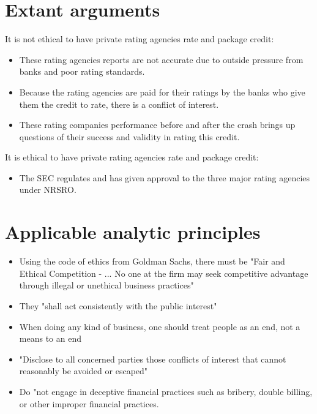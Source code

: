 \documentclass[11pt]{article}
\begin{document}
\section{Extant arguments}
It is not ethical to have private rating agencies rate and package credit:
\begin{itemize}
\item These rating agencies reports are not accurate due to outside pressure from banks and poor rating standards.\cite{ratingEthics} \cite{hRatingEthics} \cite{govtReport}
\item Because the rating agencies are paid for their ratings by the banks who give them the credit to rate, there is a conflict of interest. \cite{gatekeepers}
\item These rating companies performance before and after the crash brings up questions of their success and validity in rating this credit. \cite{ratingEthics} \cite{wpMoodies}
\end{itemize}
It is ethical to have private rating agencies rate and package credit:
\begin{itemize}
\item The SEC regulates and has given approval to the three major rating agencies under NRSRO. \cite{CivilLiability}
\end{itemize}

\section{Applicable analytic principles}
\begin{itemize}
\item Using the code of ethics from Goldman Sachs, there must be "Fair and Ethical Competition - ... No one at the firm may seek competitive advantage through illegal or unethical business practices" \cite{goldmanEthics}
\item They "shall act consistently with the public interest" \cite{SEcode}
\item When doing any kind of business, one should treat people as an end, not a means to an end \cite{kant}
\item "Disclose to all concerned parties those conflicts of interest that cannot reasonably be avoided or escaped" \cite{SEcode}
\item Do "not engage in deceptive financial practices such as bribery, double billing, or other improper financial practices. 
\end{itemize}
\end{document}
